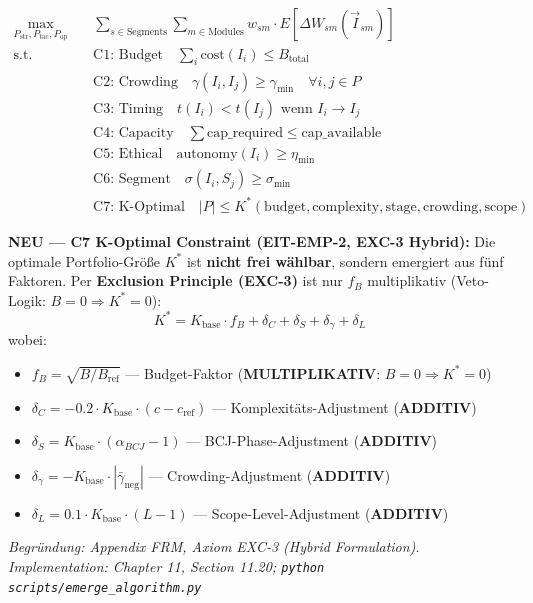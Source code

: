 \begin{definition}
\label{def:20-hierarchical-optimization}
\begin{align}
\max_{P_{\text{str}}, P_{\text{tac}}, P_{\text{op}}} \quad & \sum_{s \in \text{Segments}} \sum_{m \in \text{Modules}} w_{sm} \cdot E[\Delta W_{sm}(\vec{I}_{sm})] \label{eq:20-hierarchical-obj}\\
\text{s.t.} \quad & \text{C1: Budget} \quad \sum_i \text{cost}(I_i) \leq B_{\text{total}} \label{eq:20-c1}\\
& \text{C2: Crowding} \quad \gamma(I_i, I_j) \geq \gamma_{\min} \quad \forall i,j \in P \label{eq:20-c2}\\
& \text{C3: Timing} \quad t(I_i) < t(I_j) \text{ wenn } I_i \rightarrow I_j \label{eq:20-c3}\\
& \text{C4: Capacity} \quad \sum \text{cap\_required} \leq \text{cap\_available} \label{eq:20-c4}\\
& \text{C5: Ethical} \quad \text{autonomy}(I_i) \geq \eta_{\min} \label{eq:20-c5}\\
& \text{C6: Segment} \quad \sigma(I_i, S_j) \geq \sigma_{\min} \label{eq:20-c6}\\
& \text{C7: K-Optimal} \quad |P| \leq K^*(\text{budget}, \text{complexity}, \text{stage}, \text{crowding}, \text{scope}) \label{eq:20-c7}
\end{align}
\end{definition}

\textbf{NEU --- C7 K-Optimal Constraint (EIT-EMP-2, EXC-3 Hybrid):} Die optimale Portfolio-Größe $K^*$ ist \textbf{nicht frei wählbar}, sondern emergiert aus fünf Faktoren. Per \textbf{Exclusion Principle (EXC-3)} ist nur $f_B$ multiplikativ (Veto-Logik: $B=0 \Rightarrow K^*=0$):
\begin{equation}
K^* = K_{\text{base}} \cdot f_B + \delta_C + \delta_S + \delta_\gamma + \delta_L
\label{eq:20-k-optimal}
\end{equation}
wobei:
\begin{itemize}[nosep]
\item $f_B = \sqrt{B/B_{\text{ref}}}$ --- Budget-Faktor (\textbf{MULTIPLIKATIV}: $B=0 \Rightarrow K^*=0$)
\item $\delta_C = -0.2 \cdot K_{\text{base}} \cdot (c - c_{\text{ref}})$ --- Komplexitäts-Adjustment (\textbf{ADDITIV})
\item $\delta_S = K_{\text{base}} \cdot (\alpha_{BCJ} - 1)$ --- BCJ-Phase-Adjustment (\textbf{ADDITIV})
\item $\delta_\gamma = -K_{\text{base}} \cdot |\bar{\gamma}_{\text{neg}}|$ --- Crowding-Adjustment (\textbf{ADDITIV})
\item $\delta_L = 0.1 \cdot K_{\text{base}} \cdot (L - 1)$ --- Scope-Level-Adjustment (\textbf{ADDITIV})
\end{itemize}
\textit{Begründung: Appendix FRM, Axiom EXC-3 (Hybrid Formulation).}
\textit{Implementation: Chapter 11, Section 11.20; \texttt{python scripts/emerge\_algorithm.py}}

